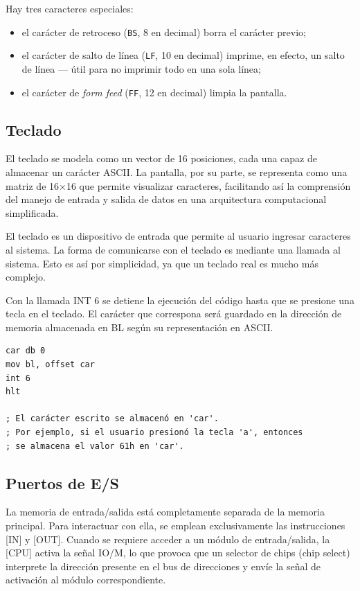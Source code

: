 \documentclass[12pt,oneside]{templates/unerthesis}
\providecommand{\tightlist}{%
  \setlength{\itemsep}{0pt}\setlength{\parskip}{0pt}}
\begin{document}
Hay tres caracteres especiales:

\begin{itemize}
\tightlist
\item
  el carácter de retroceso (\texttt{BS}, 8 en decimal) borra el carácter previo;
\item
  el carácter de salto de línea (\texttt{LF}, 10 en decimal) imprime, en efecto, un salto de línea --- útil para no imprimir todo en una sola línea;
\item
  el carácter de \emph{form feed} (\texttt{FF}, 12 en decimal) limpia la pantalla.
\end{itemize}

\hypertarget{teclado}{%
\subsection{Teclado}\label{teclado}}

El teclado se modela como un vector de 16 posiciones, cada una capaz de almacenar un carácter ASCII. La pantalla, por su parte, se representa como una matriz de 16×16 que permite visualizar caracteres, facilitando así la comprensión del manejo de entrada y salida de datos en una arquitectura computacional simplificada.

El teclado es un dispositivo de entrada que permite al usuario ingresar caracteres al sistema. La forma de comunicarse con el teclado es mediante una llamada al sistema. Esto es así por simplicidad, ya que un teclado real es mucho más complejo.

Con la llamada INT 6 se detiene la ejecución del código hasta que se presione una tecla en el teclado. El carácter que correspona será guardado en la dirección de memoria almacenada en BL según su representación en ASCII.

\begin{lstlisting}
car db 0
mov bl, offset car
int 6
hlt

; El carácter escrito se almacenó en 'car'.
; Por ejemplo, si el usuario presionó la tecla 'a', entonces
; se almacena el valor 61h en 'car'.\end{lstlisting}

\hypertarget{puertos-de-es}{%
\subsection{Puertos de E/S}\label{puertos-de-es}}

La memoria de entrada/salida está completamente separada de la memoria principal. Para interactuar con ella, se emplean exclusivamente las instrucciones {[}IN{]} y {[}OUT{]}. Cuando se requiere acceder a un módulo de entrada/salida, la {[}CPU{]} activa la señal IO/M, lo que provoca que un selector de chips (chip select) interprete la dirección presente en el bus de direcciones y envíe la señal de activación al módulo correspondiente.
\end{document}
